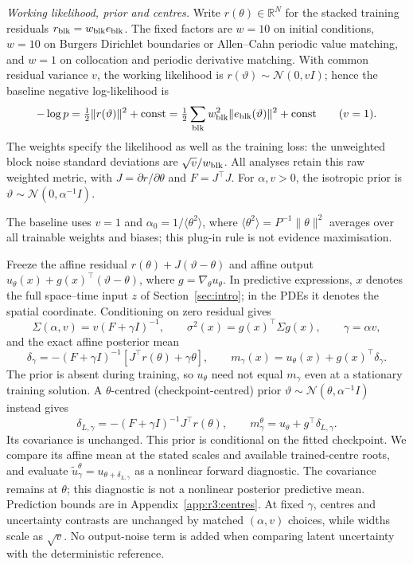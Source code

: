 \emph{Working likelihood, prior and centres.}
Write $r(\theta)\in\mathbb R^N$ for the stacked training residuals
$r_{\rm blk}=w_{\rm blk}e_{\rm blk}$. The fixed factors are $w=10$ on initial conditions,
$w=10$ on Burgers Dirichlet boundaries or Allen--Cahn periodic value matching,
and $w=1$ on collocation and periodic derivative matching. With common residual
variance $v$, the working likelihood is $r(\vartheta)\sim\mathcal N(0,vI)$; hence
the baseline negative log-likelihood is
\begin{equation*}
 -\log p=\tfrac12\|r(\vartheta)\|^2+\mathrm{const}
 =\tfrac12\sum_{\rm blk}w_{\rm blk}^2\|e_{\rm blk}(\vartheta)\|^2+\mathrm{const}
 \qquad(v=1).
\end{equation*}
The weights specify the likelihood as well as the training loss: the unweighted
block noise standard deviations are $\sqrt v/w_{\rm blk}$.
All analyses retain this raw weighted metric, with $J=\partial r/\partial\theta$
and $F=J^\top J$. For $\alpha,v>0$, the isotropic prior is $\vartheta\sim\mathcal N(0,\alpha^{-1}I)$.

\begin{samepage}
The baseline uses $v=1$ and $\alpha_0=1/\langle\theta^2\rangle$, where
$\langle\theta^2\rangle=P^{-1}\|\theta\|^2$ averages over all trainable weights
and biases; this plug-in rule is not evidence maximisation.
\end{samepage}

Freeze the affine residual $r(\theta)+J(\vartheta-\theta)$ and affine output
$u_\theta(x)+g(x)^\top(\vartheta-\theta)$, where $g=\nabla_\theta u_\theta$.
In predictive expressions, $x$ denotes the full space--time input $z$ of
Section~\ref{sec:intro}; in the PDEs it denotes the spatial coordinate.
Conditioning on zero residual gives
\[
 \Sigma(\alpha,v)=v(F+\gamma I)^{-1},\qquad
 \sigma^2(x)=g(x)^\top\Sigma g(x),\qquad \gamma=\alpha v,
\]
and the exact affine posterior mean
\begin{equation}\label{eq:affine-mean}
 \delta_\gamma=-(F+\gamma I)^{-1}[J^\top r(\theta)+\gamma\theta],
 \qquad m_\gamma(x)=u_\theta(x)+g(x)^\top\delta_\gamma.
\end{equation}
The prior is absent during training, so $u_\theta$ need not equal $m_\gamma$ even
at a stationary training solution. A $\theta$-centred (checkpoint-centred) prior
$\vartheta\sim\mathcal N(\theta,\alpha^{-1}I)$ instead gives
\[
 \delta_{L,\gamma}=-(F+\gamma I)^{-1}J^\top r(\theta),\qquad
 m^\theta_\gamma=u_\theta+g^\top\delta_{L,\gamma}.
\]
Its covariance is unchanged. This prior is conditional on the fitted checkpoint.
We compare its affine mean at the stated scales and available trained-centre roots,
and evaluate $\widetilde u^\theta_\gamma=u_{\theta+\delta_{L,\gamma}}$ as a nonlinear
forward diagnostic. The covariance remains at $\theta$; this diagnostic is not a
nonlinear posterior predictive mean. Prediction bounds are in
Appendix~\ref{app:r3:centres}.
At fixed $\gamma$, centres and uncertainty contrasts are unchanged by matched
$(\alpha,v)$ choices, while widths scale as $\sqrt v$. No output-noise term is added
when comparing latent uncertainty with the deterministic reference.

